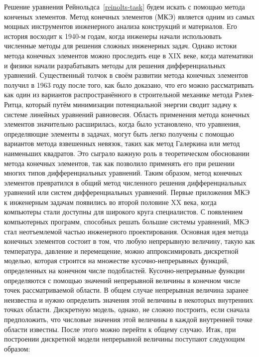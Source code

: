 \documentclass[a4paper,14pt]{extarticle}
\begin{document}
Решение уравнения Рейнольдса~\eqref{reinolts-task} будем искать с помощью метода конченых элементов.
Метод конечных элементов (МКЭ) является одним из самых мощных инструментов инженерного анализа конструкций и материалов. Его история восходит к 1940-м годам, когда инженеры начали использовать численные методы для решения сложных инженерных задач. Однако истоки метода конечных элементов можно проследить еще в XIX веке, когда математики и физики начали разрабатывать методы для решения дифференциальных уравнений. 
Существенный толчок в своём развитии метода конечных элементов получил в 1963 году после того, как было доказано, что его можно рассматривать как один из вариантов распространённого в строительной механике метода Рэлея-Ритца, который путём минимизации потенциальной энергии сводит задачу к системе линейных уравнений равновесия. Область применения метода конечных элементов значительно расширилась, когда было установлено, что уравнения, определяющие элементы в задачах, могут быть легко получены с помощью вариантов метода взвешенных невязок, таких как метод Галеркина или метод наименьших квадратов. Это сыграло важную роль в теоретическом обосновании метода конечных элементов, так как позволило применять его при решении многих типов дифференциальных уравнений. Таким образом, метод конечных элементов превратился в общий метод численного решения дифференциальных уравнений или систем дифференциальных уравнений. Первые приложения МКЭ к инженерным задачам появились во второй половине XX века, когда компьютеры стали доступны для широкого круга специалистов. С появлением компьютерных программ, способных решать большие системы уравнений, МКЭ стал неотъемлемой частью инженерного проектирования.
Основная идея метода конечных элементов состоит в том, что любую непрерывную величину, такую как температура, давление и перемещение, можно аппроксимировать дискретной моделью, которая строится на множестве кусочно-непрерывных функций, определенных на конечном числе подобластей. Кусочно-непрерывные функции определяются с помощью значений непрерывной величины в конечном числе точек рассматриваемой области.
В общем случае непрерывная величина заранее неизвестна и нужно определить значения этой величины в некоторых внутренних точках области. Дискретную модель, однако, не сложно построить, если сначала предположить, что числовые значения этой величины в каждой внутренней точке области известны. После этого можно перейти к общему случаю. Итак, при построении дискретной модели непрерывной величины поступают следующим образом:
\end{document}
